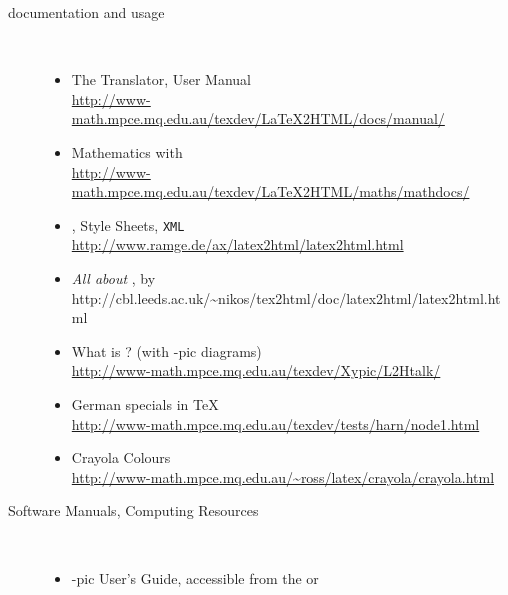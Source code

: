 \begin{description}
%
\item [\latextohtml{} documentation and usage]~%
\begin{itemize}
\item 
The \latextohtml{} Translator, User Manual\\
\url{http://www-math.mpce.mq.edu.au/texdev/LaTeX2HTML/docs/manual/}\\
\onlinedoc
\html{\smallskip}%

\item 
Mathematics with \latextohtml{}\\
\url{http://www-math.mpce.mq.edu.au/texdev/LaTeX2HTML/maths/mathdocs/}
\html{\smallskip}%

\item 
\latextohtml, Style Sheets, \texttt{XML}\\
\url{http://www.ramge.de/ax/latex2html/latex2html.html}
\html{\smallskip}%

\item
\textit{All about }\latextohtml, by %
{http://cbl.leeds.ac.uk/\~{}nikos/tex2html/doc/latex2html/latex2html.html}
\html{\smallskip}%

\item 
What is \latextohtml{}? (with \Xy-pic diagrams)\\
\url{http://www-math.mpce.mq.edu.au/texdev/Xypic/L2Htalk/}
\html{\smallskip}%

\item 
German specials in \TeX\\
\url{http://www-math.mpce.mq.edu.au/texdev/tests/harn/node1.html}
\html{\smallskip}%

\item
Crayola Colours\\
\url{http://www-math.mpce.mq.edu.au/~ross/latex/crayola/crayola.html}
\html{\smallskip}%


%

\end{itemize}

\htmlrule[50\% center]


\item[Software Manuals, Computing Resources]~%
\begin{itemize}
%
\item 
\Xy-pic User's Guide, accessible from the 
or 
\html{\smallskip}%


\end{itemize}
\end{description}
